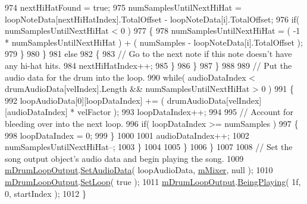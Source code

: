 \begin{DoxyCode}
974                             nextHiHatFound = \textcolor{keyword}{true};
975                             numSamplesUntilNextHiHat = loopNoteData[nextHiHatIndex].TotalOffset - 
      loopNoteData[i].TotalOffset;
976                             \textcolor{keywordflow}{if}( numSamplesUntilNextHiHat < 0 )
977                             \{
978                                 numSamplesUntilNextHiHat = ( -1 * numSamplesUntilNextHiHat ) + ( numSamples
       - loopNoteData[i].TotalOffset );
979                             \}
980                         \}
981                         \textcolor{keywordflow}{else}
982                         \{
983                             \textcolor{comment}{// Go to the next note if this note doesn't have any hi-hat hits.}
984                             nextHiHatIndex++;
985                         \}
986                     \}
987                 \}
988 
989                 \textcolor{comment}{// Put the audio data for the drum into the loop.}
990                 \textcolor{keywordflow}{while}( audioDataIndex < drumAudioData[velIndex].Length && numSamplesUntilNextHiHat > 0 )
991                 \{
992                     loopAudioData[0][loopDataIndex] += ( drumAudioData[velIndex][audioDataIndex] * 
      velFactor );
993                     loopDataIndex++;
994 
995                     \textcolor{comment}{// Account for bleeding over into the next loop.}
996                     \textcolor{keywordflow}{if}( loopDataIndex >= numSamples )
997                     \{
998                         loopDataIndex = 0;
999                     \}
1000 
1001                     audioDataIndex++;
1002                     numSamplesUntilNextHiHat--;
1003                 \}
1004 
1005             \}
1006         \}
1007 
1008         \textcolor{comment}{// Set the song output object's audio data and begin playing the song.}
1009         \hyperlink{group___v_i_m_priv_ga5f71cb71d240042312dcc13b481b068d}{mDrumLoopOutput}.\hyperlink{group___n_o_o_pub_func_gaef9ab691f0a2671a62249d853f24162d}{SetAudioData}( loopAudioData, 
      \hyperlink{group___v_i_m_priv_ga08c8db1bb89f4ab1e28451dd93d6b99c}{mMixer}, null );
1010         \hyperlink{group___v_i_m_priv_ga5f71cb71d240042312dcc13b481b068d}{mDrumLoopOutput}.\hyperlink{group___n_o_o_pub_func_ga7b79bbd2c7a68831b322edff140f29d2}{SetLoop}( \textcolor{keyword}{true} );
1011         \hyperlink{group___v_i_m_priv_ga5f71cb71d240042312dcc13b481b068d}{mDrumLoopOutput}.\hyperlink{group___n_o_o_pub_func_ga2bdaa2787408f353f71ef6c6a18e9285}{BeingPlaying}( 1f, 0, startIndex );
1012     \}
\end{DoxyCode}
\mbox{\label{group___v_i_m_handlers_ga80b3821df3b1488a150f6062638f105c}} 
